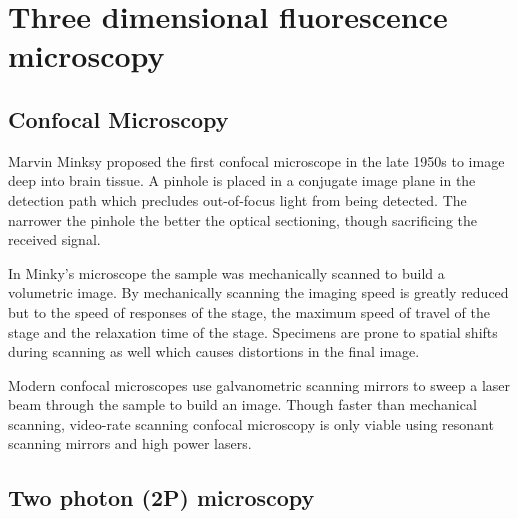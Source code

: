 \section{Three dimensional fluorescence microscopy}
\subsection{Confocal Microscopy}

Marvin Minksy proposed the first \gls{confocal microscope} in the late 1950s to image deep into brain tissue.
A pinhole is placed in a conjugate image plane in the detection path which precludes out-of-focus light from being detected.
The narrower the pinhole the better the optical sectioning, though sacrificing the received signal.

In Minky's microscope the sample was mechanically scanned to build a volumetric image.
By mechanically scanning the imaging speed is greatly reduced but to the speed of responses of the stage, the maximum speed of travel of the stage and the relaxation time of the stage.
Specimens are prone to spatial shifts during scanning as well which causes distortions in the final image.

Modern \gls{confocal microscope}s use \gls{galvanometric scanning mirrors} to sweep a laser beam through the sample to build an image.
Though faster than mechanical scanning, video-rate scanning confocal microscopy is only viable using \gls{resonant scanning mirrors} and high power lasers.

%

\subsection{Two photon (2P) microscopy}


